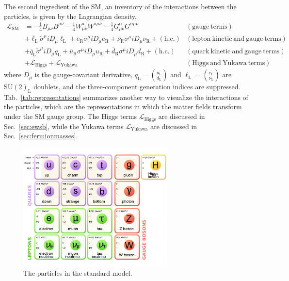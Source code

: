The second ingredient of the SM, an inventory of the interactions between the
particles, is given by the Lagrangian density, 
\begin{align}
\mathcal{L}_{\mathrm{SM}} &= -\frac{1}{4}B_{\mu\nu}B^{\mu\nu} -\frac{1}{4}W^{a}_{\mu\nu}W^{a\mu\nu} - \frac{1}{4}G^{\alpha}_{\mu\nu}G^{\alpha\mu\nu}
  & \mathrm{(gauge~terms)}\nonumber\\
& +\overline\ell_\mathrm{L}\tilde\sigma^{\mu}iD_{\mu}\ell_\mathrm{L} +
   \overline e_\mathrm{R}\sigma^{\mu}iD_{\mu}e_\mathrm{R} + \overline \nu_\mathrm{R}
   \sigma^{\mu}iD_{\mu}\nu_\mathrm{R} + (\mathrm{h.c.})& \mathrm{(lepton~kinetic~and~gauge~terms)}\nonumber\\
& +\overline q_\mathrm{L}\tilde\sigma^{\mu}iD_{\mu}q_\mathrm{L} +
   \overline u_\mathrm{R}\sigma^{\mu}iD_{\mu}u_\mathrm{R} + \overline d_\mathrm{R}
   \sigma^{\mu}iD_{\mu}d_\mathrm{R} + (\mathrm{h.c.})& \mathrm{(quark~kinetic~and~gauge~terms)}\nonumber\\
& +\mathcal L_{\mathrm{Higgs}} +\mathcal L_{\mathrm{Yukawa}} &  \mathrm{(Higgs~and~Yukawa~terms)}
\label{eqn:lsm}
\end{align}
where $D_{\mu}$ is the gauge-covariant derivative, $q_\mathrm{L} =
\binom{u_\mathrm{L}}{d_\mathrm{L}}$ and $\ell_\mathrm{L} = \binom{e_\mathrm{L}}{\nu_\mathrm{L}}$ are
$\mathrm{SU(2)}_{\mathrm{L}}$ doublets, and the three-component
generation indices are suppressed.
Tab.~\ref{tab:representations} summarizes another way to visualize the
interactions of the particles, which are the representations in which the matter fields transform under the SM
gauge group. The Higgs terms $\mathcal L_{\mathrm{Higgs}}$ are discussed in
Sec.~\ref{sec:ewsb}, while the Yukawa terms $\mathcal
L_{\mathrm{Yukawa}}$ are discussed in Sec.~\ref{sec:fermionmasses}.

\begin{figure}
\centering
\includegraphics[width=0.7\textwidth]{figs/theory/standardmodel.pdf}
\caption{\label{fig:standardmodel} The particles in the standard model.}
\end{figure}

